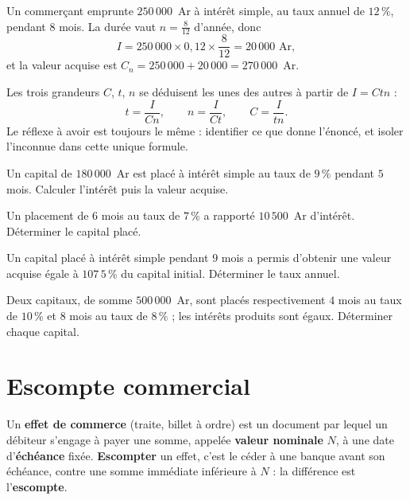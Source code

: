 \begin{exemple}
Un commerçant emprunte $250\,000$~Ar à intérêt simple, au taux annuel de
$12\,\%$, pendant $8$ mois. La durée vaut $n = \frac{8}{12}$ d'année, donc
\[
  I = 250\,000 \times 0{,}12 \times \frac{8}{12} = 20\,000 \text{ Ar},
\]
et la valeur acquise est $C_{n} = 250\,000+20\,000 = 270\,000$~Ar.
\end{exemple}

\begin{propriete}
Les trois grandeurs $C$, $t$, $n$ se déduisent les unes des autres à partir
de $I = Ctn$ :
\[
  t = \frac{I}{Cn}, \qquad n = \frac{I}{Ct}, \qquad C = \frac{I}{tn} .
\]
Le réflexe à avoir est toujours le même : identifier ce que donne l'énoncé,
et isoler l'inconnue dans cette unique formule.
\end{propriete}

\begin{entrainement}
\exo[\niveau{1}] Un capital de $180\,000$~Ar est placé à intérêt simple au
taux de $9\,\%$ pendant $5$ mois. Calculer l'intérêt puis la valeur acquise.

\exo[\niveau{1}] Un placement de $6$ mois au taux de $7\,\%$ a rapporté
$10\,500$~Ar d'intérêt. Déterminer le capital placé.

\exo[\niveau{2}] Un capital placé à intérêt simple pendant $9$ mois a permis
d'obtenir une valeur acquise égale à $107\,5\,\%$ du capital initial.
Déterminer le taux annuel.

\exo[\niveau{2}] Deux capitaux, de somme $500\,000$~Ar, sont placés
respectivement $4$ mois au taux de $10\,\%$ et $8$ mois au taux de $8\,\%$ ;
les intérêts produits sont égaux. Déterminer chaque capital.
\end{entrainement}

\section{Escompte commercial}

\begin{definition}
Un \textbf{effet de commerce} (traite, billet à ordre) est un document par
lequel un débiteur s'engage à payer une somme, appelée \textbf{valeur
nominale} $N$, à une date d'\textbf{échéance} fixée. \textbf{Escompter} un
effet, c'est le céder à une banque avant son échéance, contre une somme
immédiate inférieure à $N$ : la différence est l'\textbf{escompte}.
\end{definition}

